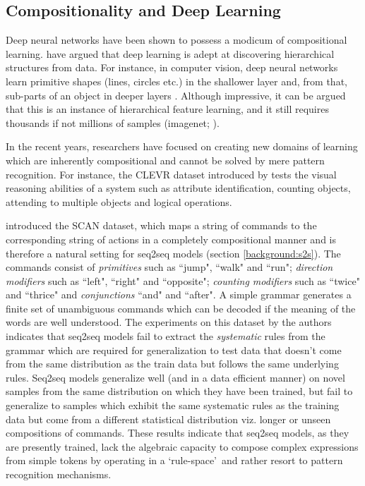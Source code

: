 
\subsection{Compositionality and Deep Learning}
Deep neural networks have been shown to possess a modicum of compositional learning. \cite{LeCun2015} have argued that deep learning is adept at discovering hierarchical structures from data. For instance, in computer vision, deep neural networks learn primitive shapes (lines, circles etc.) in the shallower layer and, from that, sub-parts of an object in deeper layers \citep{Zeiler2014}. Although impressive, it can be argued that this is an instance of hierarchical feature learning, and it still requires thousands if not millions of samples (imagenet; \citep{Deng2009}).

In the recent years, researchers have focused on creating new domains of learning which are inherently compositional and cannot be solved by mere pattern recognition. For instance, the CLEVR dataset introduced by \cite{Johnson2017} tests the visual reasoning abilities of a system such as attribute identification, counting objects, attending to multiple objects and logical operations. 


\cite{Lake2017} introduced the SCAN dataset, which maps a string of commands to the corresponding string of actions in a completely compositional manner and is therefore a natural setting for seq2seq models (section \ref{background:s2s}). The commands consist of \textit{primitives} such as ``jump", ``walk" and ``run"; \textit{direction modifiers} such as ``left", ``right" and ``opposite"; \textit{counting modifiers} such as ``twice" and ``thrice" and \textit{conjunctions} ``and" and ``after". A simple grammar generates a finite set of unambiguous commands which can be decoded if the meaning of the words are well understood. The experiments on this dataset by the authors indicates that seq2seq models fail to extract the \textit{systematic} rules from the grammar which are required for generalization to test data that doesn't come from the same distribution as the train data but follows the same underlying rules. Seq2seq models generalize well (and in a data efficient manner) on novel samples from the same distribution on which they have been trained, but fail to generalize to samples which exhibit the same systematic rules as the training data but come from a different statistical distribution viz. longer or unseen compositions of commands. These results indicate that seq2seq models, as they are presently trained, lack the algebraic capacity to compose complex expressions from simple tokens by operating in a \lq rule-space{}\rq\ and rather resort to pattern recognition mechanisms.

